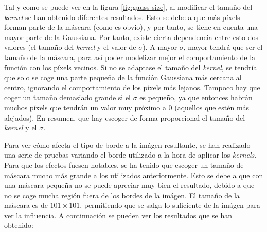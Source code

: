 \documentclass[11pt,a4paper]{article}
\begin{document}
Tal y como se puede ver en la figura \ref{fig:gauss-size}, al modificar el tamaño del \textit{kernel} se han obtenido
diferentes resultados. Esto se debe a que más píxels forman parte de la máscara (como es obvio), y por tanto, se tiene
en cuenta una mayor parte de la Gaussiana. Por tanto, existe cierta dependencia entre esto dos valores (el tamaño del
\textit{kernel} y el valor de $\sigma$). A mayor $\sigma$, mayor tendrá que ser el tamaño de la máscara, para así poder
modelizar mejor el comportamiento de la función con los píxels vecinos. Si no se adaptase el tamaño del \textit{kernel},
se tendría que solo se coge una parte pequeña de la función Gaussiana más cercana al centro, ignorando el comportamiento
de los píxels más lejanos. Tampoco hay que coger un tamaño demasiado grande si el $\sigma$ es pequeño, ya que entonces
habrán muchos píxels que tendrán un valor muy próximo a 0 (aquellos que estén más alejados). En resumen, que hay
escoger de forma proporcional el tamaño del \textit{kernel} y el $\sigma$.

Para ver cómo afecta el tipo de borde a la imágen resultante, se han realizado una serie de pruebas variando el borde
utilizado a la hora de aplicar los \textit{kernels}. Para que los efectos fuesen notables, se ha tenido que escoger un
tamaño de máscara mucho más grande a los utilizados anteriormente. Esto se debe a que con una máscara pequeña no se
puede apreciar muy bien el resultado, debido a que no se coge mucha región fuera de los bordes de la imágen. El tamaño de
la máscara es de $101 \times 101$, permitiendo que se salga lo suficiente de la imágen para ver la influencia. A continuación
se pueden ver los resultados que se han obtenido:
\end{document}

